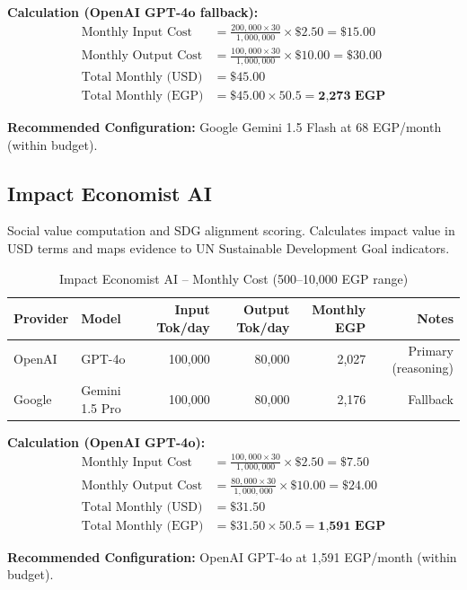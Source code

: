 \documentclass[11pt,a4paper]{article}
\begin{document}
\noindent\textbf{Calculation (OpenAI GPT-4o fallback):}
\begin{align*}
\text{Monthly Input Cost} &= \frac{200{,}000 \times 30}{1{,}000{,}000} \times \$2.50 = \$15.00 \\
\text{Monthly Output Cost} &= \frac{100{,}000 \times 30}{1{,}000{,}000} \times \$10.00 = \$30.00 \\
\text{Total Monthly (USD)} &= \$45.00 \\
\text{Total Monthly (EGP)} &= \$45.00 \times 50.5 = \textbf{2,273 EGP}
\end{align*}

\textbf{Recommended Configuration:} Google Gemini 1.5 Flash at 68 EGP/month (within budget).

\subsection{Impact Economist AI}

Social value computation and SDG alignment scoring. Calculates impact value in USD terms and maps evidence to UN Sustainable Development Goal indicators.

\begin{table}[H]
\centering
\begin{tabular}{|l|l|r|r|r|r|}
\hline
\textbf{Provider} & \textbf{Model} & \textbf{Input Tok/day} & \textbf{Output Tok/day} & \textbf{Monthly EGP} & \textbf{Notes} \\
\hline
OpenAI & GPT-4o & 100,000 & 80,000 & 2,027 & Primary (reasoning) \\
\hline
Google & Gemini 1.5 Pro & 100,000 & 80,000 & 2,176 & Fallback \\
\hline
\end{tabular}
\caption{Impact Economist AI -- Monthly Cost (500--10,000 EGP range)}
\end{table}

\noindent\textbf{Calculation (OpenAI GPT-4o):}
\begin{align*}
\text{Monthly Input Cost} &= \frac{100{,}000 \times 30}{1{,}000{,}000} \times \$2.50 = \$7.50 \\
\text{Monthly Output Cost} &= \frac{80{,}000 \times 30}{1{,}000{,}000} \times \$10.00 = \$24.00 \\
\text{Total Monthly (USD)} &= \$31.50 \\
\text{Total Monthly (EGP)} &= \$31.50 \times 50.5 = \textbf{1,591 EGP}
\end{align*}

\textbf{Recommended Configuration:} OpenAI GPT-4o at 1,591 EGP/month (within budget).
\end{document}
